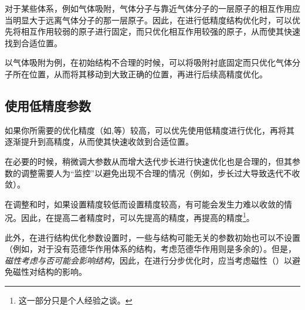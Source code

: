 对于某些体系，例如气体吸附，气体分子与靠近气体分子的一层原子的相互作用应当明显大于远离气体分子的那一层原子。因此，在进行低精度结构优化时，可以优先将相互作用较弱的原子进行固定，而只优化相互作用较强的原子，从而使其快速找到合适位置。

以气体吸附为例，在初始结构不合理的时候，可以将吸附衬底固定而只优化气体分子所在位置，从而将其移动到大致正确的位置，再进行后续高精度优化。

\subsection{使用低精度参数}\label{subsec:一些结构优化的策略与加速方法-使用低精度参数}

如果你所需要的优化精度（如,等）较高，可以优先使用低精度进行优化，再将其逐渐提升到高精度，从而使其快速收敛到合适位置。

在必要的时候，稍微调大参数从而增大迭代步长进行快速优化也是合理的，但其参数的调整需要人为“监控”以避免出现不合理的情况（例如，步长过大导致迭代不收敛）。

在调整和时，如果设置精度较低而设置精度较高，有可能会发生力难以收敛的情况。因此，在提高二者精度时，可以先提高的精度，再提高的精度\footnote{这一部分只是个人经验之谈。}。

此外，在进行结构优化参数设置时，一些与结构可能无关的参数初始也可以不设置（例如，对于没有范德华作用体系的结构，考虑范德华作用则是多余的）。但是，\emph{磁性考虑与否可能会影响结构}，因此，在进行分步优化时，应当考虑磁性（）以避免磁性对结构的影响。
